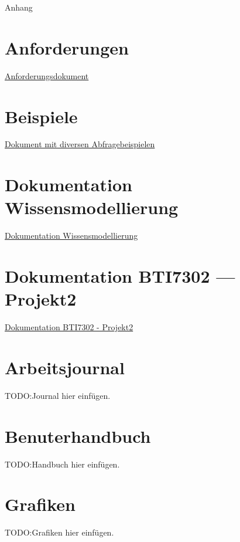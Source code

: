 \begin{titlepage}


    \clearpage
    \vspace*{\fill}
    \begin{center}
        \begin{minipage}{.6\textwidth}
            \fontsize{26pt}{28pt}\selectfont
            Anhang
        \end{minipage}
    \end{center}
    \vfill %
    \clearpage


\end{titlepage}

\newpage 


\appendix

\section*{Anforderungen}
\label{sec:anhang:anforderungen}
\href{anhang/anforderungen.pdf}{Anforderungsdokument}

\section*{Beispiele}
\label{sec:anhang:sparql_beispiele}
\href{anhang/schnipsel.pdf}{Dokument mit diversen Abfragebeispielen}

\section*{Dokumentation Wissensmodellierung}
\label{sec:anhang:tutorial_dokument}
\href{../Tutorial/template.pdf}{Dokumentation Wissensmodellierung}

\section*{Dokumentation BTI7302 --- Projekt2}
\label{sec:anhang:projekt2}
\href{../Extern/EigeneDokumente/DokumentationProjekt2.pdf}{Dokumentation BTI7302 - Projekt2}

\section*{Arbeitsjournal}
\label{sec:anhang:journal}
TODO:\@ Journal hier einfügen.

\section*{Benuterhandbuch}
\label{sec:anhang:handbuch}
TODO:\@ Handbuch hier einfügen.

\section*{Grafiken}
\label{sec:anhang:grafiken}
TODO:\@ Grafiken hier einfügen.
